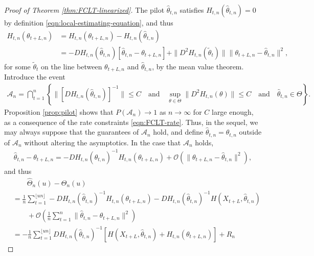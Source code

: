 \documentclass[10pt, a4paper]{article}
\theoremstyle{assumption}
\theoremstyle{definition}
\theoremstyle{theorem}
\begin{document}
\begin{proof}[Proof of Theorem \ref{thm:FCLT-linearized}]
    The pilot $\widehat{\theta}_{t,n}$ satisfies $H_{t,n}(\widehat{\theta}_{t,n})=0$ by definition \eqref{eqn:local-estimating-equation}, and thus
    \begin{align*}
        H_{t,n}(\theta_{t+L,n}) 
        &= H_{t,n}(\theta_{t+L,n}) - H_{t,n}(\widehat{\theta}_{t,n}) \\
        &= -D H_{t,n}(\widehat{\theta}_{t,n}) \left[ \widehat{\theta}_{t,n} - \theta_{t+L,n} \right] + \|D^2H_{t,n}(\widetilde{\theta}_t)\| \|\theta_{t+L,n} - \widehat{\theta}_{t,n}\|^2,
    \end{align*}
    for some $\widetilde{\theta}_{t}$ on the line between $\theta_{t+L,n}$ and $\widehat{\theta}_{t,n}$, by the mean value theorem.
    Introduce the event
    \begin{align*}
        \mathcal{A}_n = \bigcap_{t=1}^n \left\{ \|[DH_{t,n}(\widehat{\theta}_{t,n})]^{-1}\| \leq C \quad \text{and} \quad \sup_{\theta\in \Theta}\|D^2H_{t,n}(\theta)  \| \leq C\quad \text{and} \quad  \widehat{\theta}_{t,n}\in\Theta \right\}.
    \end{align*}
    Proposition \ref{prop:pilot} shows that $P(\mathcal{A}_n)\to 1$ as $n\to\infty$ for $C$ large enough, as a consequence of the rate constraints \eqref{eqn:FCLT-rate}.
    Thus, in the sequel, we may always suppose that the guarantees of $\mathcal{A}_n$ hold, and define $\widehat{\theta}_{t,n}=\theta_{t,n}$ outside of $\mathcal{A}_n$ without altering the asymptotics.
    In the case that $\mathcal{A}_n$ holds,
    \begin{align*}
        \widehat{\theta}_{t,n} - \theta_{t+L,n} = -D H_{t,n}(\widehat{\theta}_{t,n})^{-1}  H_{t,n}(\theta_{t+L,n})  + \mathcal{O}\left( \|\theta_{t+L,n}-\widehat{\theta}_{t,n}\|^2\right),
    \end{align*}
    and thus
    \begin{align}
        &\qquad \widehat{\Theta}_{n}(u) - \Theta_n(u) \nonumber\\
        &= \frac{1}{n} \sum_{t=1}^{\lfloor un \rfloor} -DH_{t,n}(\widehat{\theta}_{t,n})^{-1} H_{t,n}(\theta_{t+L,n}) - DH_{t,n}(\widehat{\theta}_{t,n})^{-1} H(X_{t+L}, \widehat{\theta}_{t,n})\nonumber\\
        &\qquad + \mathcal{O}\left(  \frac{1}{n}\sum_{t=1}^n \|\widehat{\theta}_{t,n}-\theta_{t+L,n}\|^2\right) \nonumber\\
        &= -\frac{1}{n} \sum_{t=1}^{\lfloor un \rfloor} DH_{t,n}(\widehat{\theta}_{t,n})^{-1} \left[ H(X_{t+L}, \widehat{\theta}_{t,n}) + H_{t,n}(\theta_{t+L,n}) \right] + R_n\nonumber

\end{align}
\end{proof}
\end{document}
